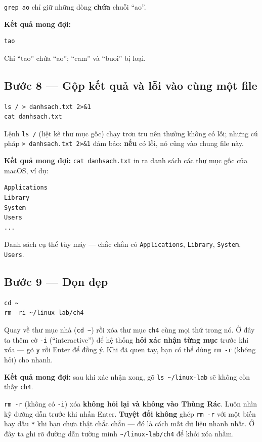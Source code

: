 \documentclass[12pt,a4paper]{article}
\newcommand{\cmd}[1]{\texttt{#1}}
\begin{document}
\cmd{grep ao} chỉ giữ những dòng \textbf{chứa} chuỗi ``ao''.

\textbf{Kết quả mong đợi:}
\begin{Verbatim}
tao
\end{Verbatim}
Chỉ ``tao'' chứa ``ao''; ``cam'' và ``buoi'' bị loại.

\subsection{Bước 8 --- Gộp kết quả và lỗi vào cùng một file}

\begin{Verbatim}
ls / > danhsach.txt 2>&1
cat danhsach.txt
\end{Verbatim}

Lệnh \cmd{ls /} (liệt kê thư mục gốc) chạy trơn tru nên thường không có lỗi; nhưng cú pháp \cmd{> danhsach.txt 2>\&1} đảm bảo: \textbf{nếu} có lỗi, nó cũng vào chung file này.

\textbf{Kết quả mong đợi:} \cmd{cat danhsach.txt} in ra danh sách các thư mục gốc của macOS, ví dụ:
\begin{Verbatim}
Applications
Library
System
Users
...
\end{Verbatim}
Danh sách cụ thể tùy máy --- chắc chắn có \cmd{Applications}, \cmd{Library}, \cmd{System}, \cmd{Users}.

\subsection{Bước 9 --- Dọn dẹp}

\begin{Verbatim}
cd ~
rm -ri ~/linux-lab/ch4
\end{Verbatim}

Quay về thư mục nhà (\cmd{cd \textasciitilde{}}) rồi xóa thư mục \cmd{ch4} cùng mọi thứ trong nó. Ở đây ta thêm cờ \cmd{-i} (``interactive'') để hệ thống \textbf{hỏi xác nhận từng mục} trước khi xóa --- gõ \cmd{y} rồi Enter để đồng ý. Khi đã quen tay, bạn có thể dùng \cmd{rm -r} (không hỏi) cho nhanh.

\textbf{Kết quả mong đợi:} sau khi xác nhận xong, gõ \cmd{ls \textasciitilde/linux-lab} sẽ không còn thấy \cmd{ch4}.

\begin{dangerbox}[title={Cẩn trọng}]
\cmd{rm -r} (không có \cmd{-i}) xóa \textbf{không hỏi lại và không vào Thùng Rác}. Luôn nhìn kỹ đường dẫn trước khi nhấn Enter. \textbf{Tuyệt đối không} ghép \cmd{rm -r} với một biến hay dấu \cmd{*} khi bạn chưa thật chắc chắn --- đó là cách mất dữ liệu nhanh nhất. Ở đây ta ghi rõ đường dẫn tường minh \cmd{\textasciitilde/linux-lab/ch4} để khỏi xóa nhầm.
\end{dangerbox}
\end{document}
